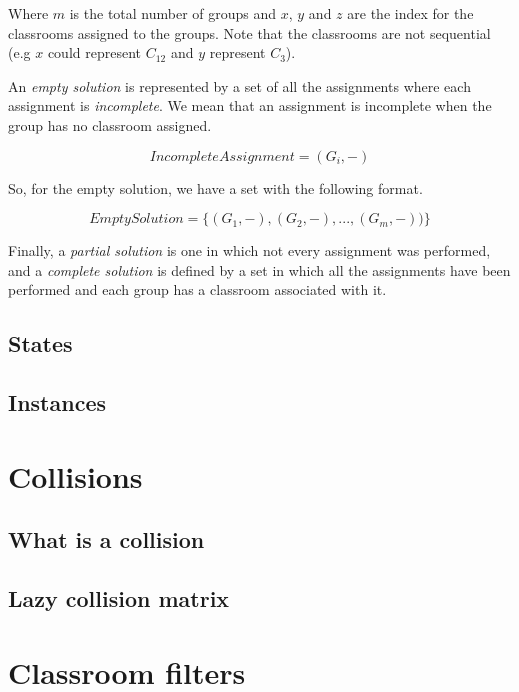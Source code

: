 Where $m$ is the total number of groups and $x$, $y$ and $z$ are the index for the classrooms assigned to the groups. Note that the classrooms are not sequential (e.g $x$ could represent $C_{12}$ and $y$ represent $C_{3}$).

An \textit{empty solution} is represented by a set of all the assignments where each assignment is \textit{incomplete}. We mean that an assignment is incomplete when the group has no classroom assigned.

\begin{equation}
    IncompleteAssignment = (G_{i}, -)
\end{equation}

So, for the empty solution, we have a set with the following format.

\begin{equation}
    EmptySolution = \{ (G_{1}, -), (G_{2}, -), ..., (G_{m}, -)) \}
\end{equation}

Finally, a \textit{partial solution} is one in which not every assignment was performed, and a \textit{complete solution} is defined by a set in which all the assignments have been performed and each group has a classroom associated with it.

\subsection{States}

\subsection{Instances}



\section{Collisions}


\subsection{What is a collision}

\subsection{Lazy collision matrix}



\section{Classroom filters}


